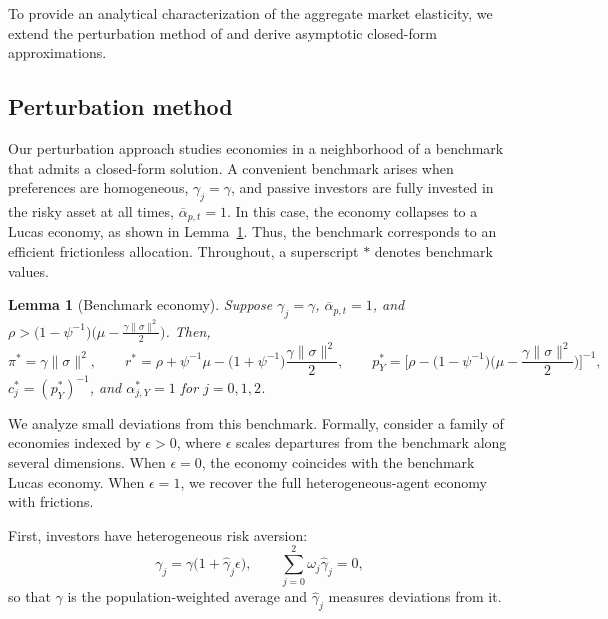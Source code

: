 \documentclass[12pt,english]{article}
\newtheorem{lemma}{Lemma}
\begin{document}
To provide an analytical characterization of the aggregate market elasticity, we extend the perturbation method of \citet{kogan2001risk} and derive asymptotic closed-form approximations.

\subsection{Perturbation method}

Our perturbation approach studies economies in a neighborhood of a benchmark that admits a closed-form solution.
A convenient benchmark arises when preferences are homogeneous, $\gamma_j=\gamma$, and passive investors are fully invested in the risky asset at all times, $\overline{\alpha}_{p,t}=1$.
In this case, the economy collapses to a Lucas economy, as shown in Lemma~\ref{lemma:benchmark}.
Thus, the benchmark corresponds to an efficient frictionless allocation.
Throughout, a superscript $*$ denotes benchmark values.


\begin{lemma}[Benchmark economy]\label{lemma:benchmark}
Suppose $\gamma_j = \gamma$, $\overline{\alpha}_{p,t} = 1$, and $\rho>\big(1-\psi^{-1}\big)\big(\mu - \frac{\gamma \|\sigma\|^2}{2}\big)$.
Then, 
\begin{equation}
        \pi^{*} = \gamma \|\sigma\|^2, \qquad 
        r^{*} = \rho + \psi^{-1}\mu - \big(1+\psi^{-1}\big)\frac{\gamma \|\sigma\|^2}{2}, \qquad 
        p_Y^{*} = \Big[\rho - \big(1-\psi^{-1}\big)\Big(\mu - \frac{\gamma \|\sigma\|^2}{2}\Big)\Big]^{-1},
\end{equation}
$c_{j}^{*} = (p_Y^{*})^{-1}$, and $\alpha_{j,Y}^{*} = 1$ for $j = 0, 1, 2$.
\end{lemma}

We analyze small deviations from this benchmark.
Formally, consider a family of economies indexed by $\epsilon>0$, where $\epsilon$ scales departures from the benchmark along several dimensions.
When $\epsilon=0$, the economy coincides with the benchmark Lucas economy.
When $\epsilon=1$, we recover the full heterogeneous-agent economy with frictions.

First, investors have heterogeneous risk aversion:
\begin{equation}\label{eq:gamma-perturb}
    \gamma_j=\gamma\big(1+\hat{\gamma}_j\epsilon\big), 
    \qquad
    \sum_{j=0}^2 \omega_j \hat{\gamma}_j=0,
\end{equation}
so that $\gamma$ is the population-weighted average and $\hat{\gamma}_j$ measures deviations from it.
\end{document}
